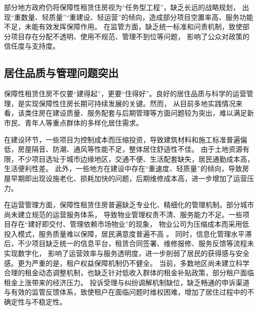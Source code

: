 部分地方政府仍将保障性租赁住房视为“任务型工程”，缺乏长远的战略规划，
出现“重数量、轻质量”“重建设、轻运营”的倾向，造成部分项目空置率高、服务功能不足，未能有效发挥保障作用。
在监管方面，缺乏统一标准和问责机制，致使部分项目存在分配不透明、使用不规范、管理不到位等问题，
影响了公众对政策的信任度与支持度。

\subsection{居住品质与管理问题突出}
保障性租赁住房不仅要“建得起”，更要“住得好”。良好的居住品质与科学的运营管理，是实现保障性住房长期可持续发展的关键。然而，
从目前多地实践情况来看，该类住房在建设质量、服务配套与后期管理等方面问题较为突出，难以满足新市民、青年人等重点群体的多样化居住需求。

在建设环节，一些项目为控制成本而压缩投资，导致建筑材料和施工标准普遍偏低，房屋隔音、防潮、通风等性能不足，整体居住舒适性不佳。
由于土地资源有限，不少项目选址于城市边缘地区，交通不便、生活配套缺失，居民通勤成本高，生活便利性差。
此外，一些地方在建设中存在“重速度、轻质量”的倾向，导致房屋早期即出现设施老化、损耗加快的问题，后期维修成本高，进一步增加了运营压力。

在运营管理方面，保障性租赁住房普遍缺乏专业化、精细化的管理机制。部分城市尚未建立规范的运营服务体系，
导致物业管理权责不清、服务能力不足。一些项目存在“建好即交付、管理依赖市场物业”的现象，
物业公司为压缩成本而采用低投入模式，服务质量难以保障，居民满意度普遍不高 \cite{RN8}。
同时，信息化管理水平滞后，不少项目缺乏统一的信息平台，租赁合同签署、维修报修、服务反馈等流程未实现数字化，
影响了运营效率与服务透明度，进一步削弱了居民的获得感与安全感。更为严重的是，租户权益保障机制仍不健全。
当前，多数地区尚未建立科学合理的租金动态调整机制，也缺乏针对低收入群体的租金补贴政策，部分租户面临租金上涨带来的经济压力。
投诉受理与纠纷调解机制缺位，缺乏畅通的申诉渠道与有效的监管反馈体系，致使租户在面临问题时维权困难，增加了居住过程中的不确定性与不稳定性。
